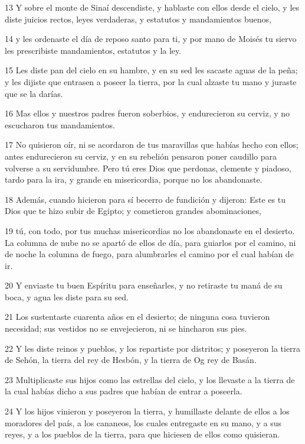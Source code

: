 \par 13 Y sobre el monte de Sinaí descendiste, y hablaste con ellos desde el cielo, y les diste juicios rectos, leyes verdaderas, y estatutos y mandamientos buenos,
\par 14 y les ordenaste el día de reposo santo para ti, y por mano de Moisés tu siervo les prescribiste mandamientos, estatutos y la ley. 
\par 15 Les diste pan del cielo en su hambre, y en su sed les sacaste aguas de la peña; y les dijiste que entrasen a poseer la tierra, por la cual alzaste tu mano y juraste que se la darías. 
\par 16 Mas ellos y nuestros padres fueron soberbios, y endurecieron su cerviz, y no escucharon tus mandamientos.
\par 17 No quisieron oír, ni se acordaron de tus maravillas que habías hecho con ellos; antes endurecieron su cerviz, y en su rebelión pensaron poner caudillo para volverse a su servidumbre. Pero tú eres Dios que perdonas, clemente y piadoso, tardo para la ira, y grande en misericordia, porque no los abandonaste.
\par 18 Además, cuando hicieron para sí becerro de fundición y dijeron: Este es tu Dios que te hizo subir de Egipto; y cometieron grandes abominaciones,
\par 19 tú, con todo, por tus muchas misericordias no los abandonaste en el desierto. La columna de nube no se apartó de ellos de día, para guiarlos por el camino, ni de noche la columna de fuego, para alumbrarles el camino por el cual habían de ir.
\par 20 Y enviaste tu buen Espíritu para enseñarles, y no retiraste tu maná de su boca, y agua les diste para su sed.
\par 21 Los sustentaste cuarenta años en el desierto; de ninguna cosa tuvieron necesidad; sus vestidos no se envejecieron, ni se hincharon sus pies. 
\par 22 Y les diste reinos y pueblos, y los repartiste por distritos; y poseyeron la tierra de Sehón, la tierra del rey de Hesbón, y la tierra de Og rey de Basán. 
\par 23 Multiplicaste sus hijos como las estrellas del cielo, y los llevaste a la tierra de la cual habías dicho a sus padres que habían de entrar a poseerla. 
\par 24 Y los hijos vinieron y poseyeron la tierra, y humillaste delante de ellos a los moradores del país, a los cananeos, los cuales entregaste en su mano, y a sus reyes, y a los pueblos de la tierra, para que hiciesen de ellos como quisieran. 
